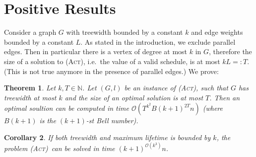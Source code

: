 \documentclass[10pt,a4paper]{article}
\newtheorem{theorem}{Theorem}[section]
\newtheorem{corollary}[theorem]{Corollary}
\numberwithin{equation}{section}
\newcommand{\N}{\mathbb{N}}
\newcommand{\bigO}{\mathcal{O}}
\newcommand{\act}{\textsc{(Act)}}
\begin{document}
\section{Positive Results}
\label{sec:positive_results}

Consider a graph $G$ with treewidth bounded by a constant $k$ and edge weights bounded by a  constant $L$. As stated in the introduction, we exclude parallel edges. Then in particular there is a vertex of degree at most $k$ in $G$, therefore the size of a solution to \act, i.e.\ the value of a valid schedule, is at most $kL =: T$. (This is not true anymore in the presence of parallel edges.) We prove:

\begin{theorem} \label{thm_dynamic_program}
Let $k, T \in \N$. Let $(G, l)$ be an instance of \act, such that $G$ has treewidth at most $k$ and the size of an optimal solution is at most $T$. Then an optimal soultion can be computed in time $\bigO(T^{k^2}B(k+1)^{2T}n)$ (where $B(k+1)$ is the $(k+1)$-st Bell number).
\end{theorem}

\begin{corollary}
If both treewidth and maximum lifetime is bounded by $k$, the problem \act\ can be solved in time $(k+1)^{\bigO(k^3)}n$.
\end{corollary}
\end{document}
